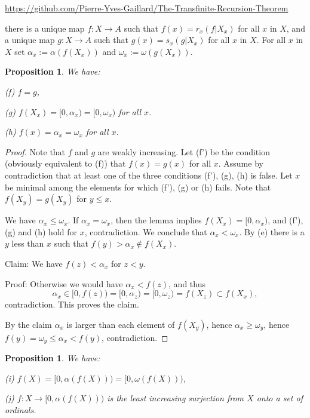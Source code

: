 \documentclass[12pt,letterpaper]{article}
\newtheorem{prop}[thm]{Proposition}
\newcommand{\noi}{\noindent}
\begin{document}
\url{https://github.com/Pierre-Yves-Gaillard/The-Transfinite-Recursion-Theorem}

\noi there is a unique map $f:X\to A$ such that $f(x)=r_x(f|X_x)$ for all $x$ in $X$, and a unique map $g:X\to A$ such that $g(x)=s_x(g|X_x)$ for all $x$ in $X$. For all $x$ in $X$ set $\alpha_x:=\alpha(f(X_x))$ and $\omega_x:=\omega(g(X_x))$.

\begin{prop}\label{P3} 
We have: 

\noi\emph{(f)} $f=g$, 

\noi\emph{(g)} $f(X_x)=[0,\alpha_x)=[0,\omega_x)$ for all $x$. 

\noi\emph{(h)} $f(x)=\alpha_x=\omega_x$ for all $x$. 
\end{prop} 

\begin{proof} 
Note that $f$ and $g$ are weakly increasing. Let (f') be the condition (obviously equivalent to (f)) that $f(x)=g(x)$ for all $x$. Assume by contradiction that at least one of the three conditions (f'), (g), (h) is false. Let $x$ be minimal among the elements for which (f'), (g) or (h) fails. Note that $f(X_y)=g(X_y)$ for $y\le x$. %

We have $\alpha_x\le\omega_x$. If $\alpha_x=\omega_x$, then the lemma implies $f(X_x)=[0,\alpha_x)$, and (f'), (g) and (h) hold for $x$, contradiction. We conclude that $\alpha_x<\omega_x$. By (e) there is a $y$ less than $x$ such that $f(y)>\alpha_x\notin f(X_x)$. %

\noi Claim: We have $f(z)<\alpha_x$ for $z<y$. 

\noi Proof: Otherwise we would have $\alpha_x<f(z)$, and thus  
$$
\alpha_x\in[0,f(z))=[0,\alpha_z)=[0,\omega_z)=f(X_z)\subset f(X_x),
$$ 
contradiction. This proves the claim. 

By the claim $\alpha_x$ is larger than each element of $f(X_y)$, hence $\alpha_x\ge\omega_y$, hence $f(y)=\omega_y\le\alpha_x<f(y)$, contradiction. 
\end{proof} 

\begin{prop}\label{P4} 
We have: 

\noi\emph{(i)} $f(X)=[0,\alpha(f(X)))=[0,\omega(f(X)))$, 

\noi\emph{(j)} $f:X\to[0,\alpha(f(X)))$ is the least increasing surjection from $X$ onto a set of ordinals. 
\end{prop} 
\end{document}
